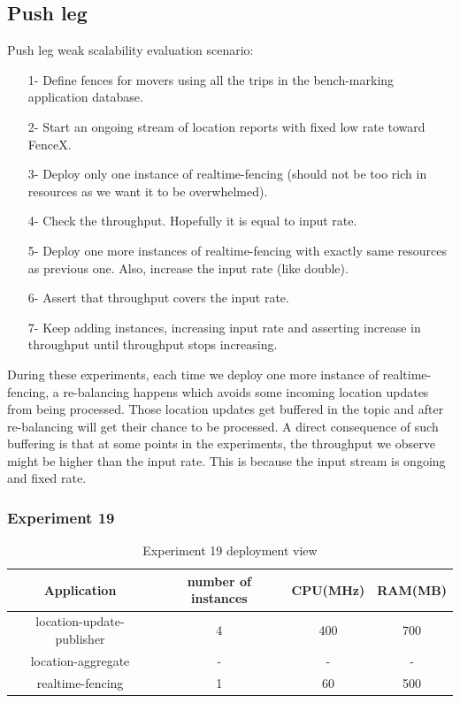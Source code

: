 \documentclass[a4]{report}
\begin{document}
    \subsection{Push leg}
    Push leg weak scalability evaluation scenario:
    \begin{itemize}
        \item[1-] Define fences for movers using all the trips in the bench-marking application database.
        \item[2-] Start an ongoing stream of location reports with fixed low rate toward FenceX.
        \item[3-] Deploy only one instance of realtime-fencing (should not be too rich in resources as we want it to
        be overwhelmed).
        \item[4-] Check the throughput. Hopefully it is equal to input rate.
        \item[5-] Deploy one more instances of realtime-fencing with exactly same resources as previous one. Also,
        increase the input rate (like double).
        \item[6-] Assert that throughput covers the input rate.
        \item[7-] Keep adding instances, increasing input rate and asserting increase in throughput until throughput
        stops increasing.
    \end{itemize}

    During these experiments, each time we deploy one more instance of realtime-fencing, a re-balancing happens which
    avoids some incoming location updates from being processed.
    Those location updates get buffered in the topic and after re-balancing will get their chance to be processed.
    A direct consequence of such buffering is that at some points in the experiments, the throughput we observe might be
    higher than the input rate.
    This is because the input stream is ongoing and fixed rate.

    \clearpage

    \subsubsection{Experiment 19}
    \begin{table}[h!]
        \centering
        \begin{tabular}{|c|c|c|c|}
            \hline
            Application               & number of instances & CPU(MHz) & RAM(MB) \\
            \hline
            location-update-publisher & 4                   & 400      & 700     \\
            location-aggregate        & -                   & -        & -       \\
            realtime-fencing          & 1                   & 60       & 500     \\
            \hline
        \end{tabular}
        \caption{Experiment 19 deployment view}
        \label{table:ex19-dv}
    \end{table}
\end{document}
